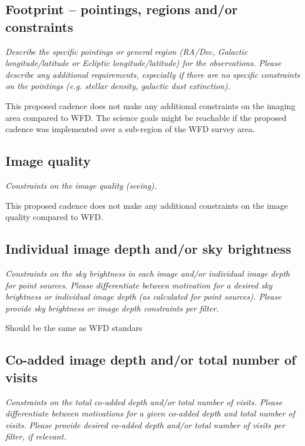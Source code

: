 \documentclass[11pt]{article}
\begin{document}
\subsection{Footprint -- pointings, regions and/or constraints}
\begin{footnotesize}{\it Describe the specific pointings or general region (RA/Dec, Galactic longitude/latitude or Ecliptic longitude/latitude) for the observations. Please describe any additional requirements, especially if there are no specific constraints on the pointings (e.g. stellar density, galactic dust extinction).}
\end{footnotesize}

This proposed cadence does not make any additional constraints on the imaging area compared to WFD. The science goals might be reachable if the proposed cadence was implemented over a sub-region of the WFD survey area.  

\subsection{Image quality}
\begin{footnotesize}{\it Constraints on the image quality (seeing).}\end{footnotesize}

This proposed cadence does not make any additional constraints on the image quality compared to WFD. 

\subsection{Individual image depth and/or sky brightness}
\begin{footnotesize}{\it Constraints on the sky brightness in each image and/or individual image depth for point sources. Please differentiate between motivation for a desired sky brightness or individual image depth (as calculated for point sources). Please provide sky brightness or image depth constraints per filter.}
\end{footnotesize}

Should be the same as WFD standars

\subsection{Co-added image depth and/or total number of visits}
\begin{footnotesize}{\it  Constraints on the total co-added depth and/or total number of visits. Please differentiate between motivations for a given co-added depth and total number of visits. Please provide desired co-added depth and/or total number of visits per filter, if relevant.}
\end{footnotesize}
\end{document}
